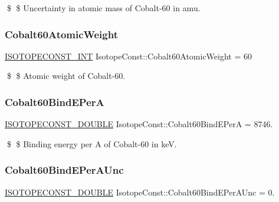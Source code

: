 \$ \$ Uncertainty in atomic mass of Cobalt-\/60 in amu. \mbox{\label{group___isotope_const-_cobalt-_co60_gacf2b35937d490241422d0d07f051a510}} 
\subsubsection{\texorpdfstring{Cobalt60\+Atomic\+Weight}{Cobalt60AtomicWeight}}
{\footnotesize\ttfamily \mbox{\hyperlink{group___isotope_const-_macros_ga5f18360b3e99483a35c32d789e62621c}{I\+S\+O\+T\+O\+P\+E\+C\+O\+N\+S\+T\+\_\+\+I\+NT}} Isotope\+Const\+::\+Cobalt60\+Atomic\+Weight = 60}

\$ \$ Atomic weight of Cobalt-\/60. \mbox{\label{group___isotope_const-_cobalt-_co60_gaf06a37d8d023ec5334230646f74911aa}} 
\subsubsection{\texorpdfstring{Cobalt60\+Bind\+E\+PerA}{Cobalt60BindEPerA}}
{\footnotesize\ttfamily \mbox{\hyperlink{group___isotope_const-_macros_ga8f45a7272ce02c0b4c65c44636ed719a}{I\+S\+O\+T\+O\+P\+E\+C\+O\+N\+S\+T\+\_\+\+D\+O\+U\+B\+LE}} Isotope\+Const\+::\+Cobalt60\+Bind\+E\+PerA = 8746.}

\$ \$ Binding energy per A of Cobalt-\/60 in keV. \mbox{\label{group___isotope_const-_cobalt-_co60_ga6df423069aacb262ce8a4857c5514fb2}} 
\subsubsection{\texorpdfstring{Cobalt60\+Bind\+E\+Per\+A\+Unc}{Cobalt60BindEPerAUnc}}
{\footnotesize\ttfamily \mbox{\hyperlink{group___isotope_const-_macros_ga8f45a7272ce02c0b4c65c44636ed719a}{I\+S\+O\+T\+O\+P\+E\+C\+O\+N\+S\+T\+\_\+\+D\+O\+U\+B\+LE}} Isotope\+Const\+::\+Cobalt60\+Bind\+E\+Per\+A\+Unc = 0.}

